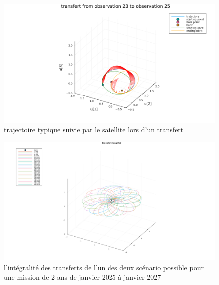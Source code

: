 \documentclass[12pt]{article} %
\begin{document}
		
		\begin{figure}[H]
			\centering
			\includegraphics[width=0.9\linewidth]{images/Transfert_23_25}
			\caption{trajectoire typique suivie par le satellite lors d'un transfert}
		\end{figure}
		\begin{figure}[H]
			\includegraphics[width=0.9\linewidth]{images/All_transfert_even_48_50}
			\caption{l'intégralité des transferts de l'un des deux scénario possible pour une mission de 2 ans de janvier 2025 à janvier 2027}
		\end{figure}
		\newpage
\end{document}
